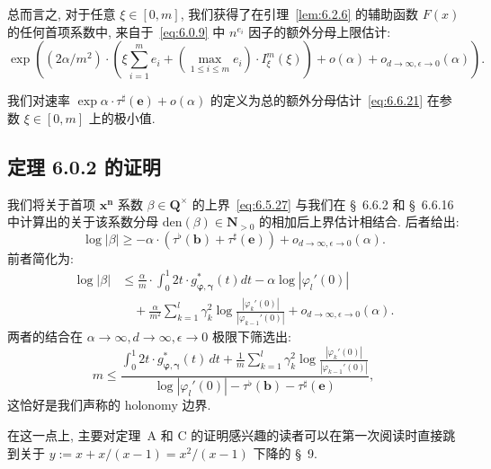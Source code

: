 总而言之, 对于任意 $\xi \in [0, m]$, 我们获得了在引理~\ref{lem:6.2.6} 的辅助函数 $F(x)$ 的任何首项系数中, 来自于~\eqref{eq:6.0.9} 中 $n^{e_i}$ 因子的额外分母上限估计:
\begin{equation}\label{eq:6.6.21}
\exp\left((2\alpha/m^2)\cdot\left(\xi\sum_{i=1}^m e_i + \left(\max_{1\leq i\leq m} e_i\right)\cdot I_\xi^m(\xi)\right) + o(\alpha) + o_{d\to\infty,\epsilon\to 0}(\alpha)\right).
\end{equation}

我们对速率 $\exp \alpha \cdot \tau^{\sharp}(\mathbf{e}) + o(\alpha)$ 的定义为总的额外分母估计~\eqref{eq:6.6.21} 在参数 $\xi \in [0, m]$ 上的极小值.

\subsection{定理 6.0.2 的证明}\label{sec:6.7}

我们将关于首项 $\mathbf{x}^{\mathbf{n}}$ 系数 $\beta \in \mathbf{Q}^{\times}$ 的上界~\eqref{eq:6.5.27} 与我们在 \S~6.6.2 和 \S~6.6.16 中计算出的关于该系数分母 $\mathrm{den}(\beta) \in \mathbf{N}_{>0}$ 的相加后上界估计相结合.
后者给出:
\begin{equation}\label{eq:6.7.1}
\log |\beta| \ge -\alpha \cdot \left(\tau^{\flat}(\mathbf{b}) + \tau^{\sharp}(\mathbf{e})\right) + o_{d \to \infty, \epsilon \to 0}(\alpha).
\end{equation}
前者简化为:
\begin{equation}\label{eq:6.7.2}
\begin{aligned}
\log |\beta| 
&\le \frac{\alpha}{m} \cdot \int_0^1 2t \cdot g_{\boldsymbol{\varphi},\boldsymbol{\gamma}}^*(t) dt - \alpha \log |\varphi_l'(0)| \\
&\quad + \frac{\alpha}{m^2} \sum_{k=1}^l \gamma_k^2 \log \frac{|\varphi_k'(0)|}{|\varphi_{k-1}'(0)|} + o_{d \to \infty, \epsilon \to 0}(\alpha).
\end{aligned}
\end{equation}
两者的结合在 $\alpha \to \infty, d \to \infty, \epsilon \to 0$ 极限下筛选出:
\begin{equation}\label{eq:6.7.3}
m \le \frac{\int_0^1 2t \cdot g_{\boldsymbol{\varphi},\boldsymbol{\gamma}}^*(t) \, dt + \frac{1}{m} \sum_{k=1}^l \gamma_k^2 \log \frac{|\varphi_k'(0)|}{|\varphi_{k-1}'(0)|}}{\log |\varphi_l'(0)| - \tau^{\flat}(\mathbf{b}) - \tau^{\sharp}(\mathbf{e})},
\end{equation}
这恰好是我们声称的 holonomy 边界.

在这一点上, 主要对定理~A 和 C 的证明感兴趣的读者可以在第一次阅读时直接跳到关于 $y:=x+x/(x-1)=x^2/(x-1)$ 下降的 \S~9.

